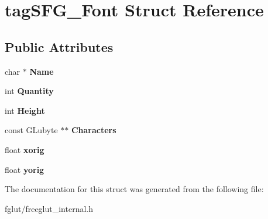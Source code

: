 \hypertarget{structtag_s_f_g___font}{}\section{tag\+S\+F\+G\+\_\+\+Font Struct Reference}
\label{structtag_s_f_g___font}
\subsection*{Public Attributes}
\begin{DoxyCompactItemize}
\item 
char $\ast$ {\bfseries Name}\hypertarget{structtag_s_f_g___font_a88a2ffc4e1720d38006875b602589cee}{}\label{structtag_s_f_g___font_a88a2ffc4e1720d38006875b602589cee}

\item 
int {\bfseries Quantity}\hypertarget{structtag_s_f_g___font_a4aa7a1492baddea769b34d0d413f2a09}{}\label{structtag_s_f_g___font_a4aa7a1492baddea769b34d0d413f2a09}

\item 
int {\bfseries Height}\hypertarget{structtag_s_f_g___font_adff4b313d038eb7e0bbad46cfa33b97e}{}\label{structtag_s_f_g___font_adff4b313d038eb7e0bbad46cfa33b97e}

\item 
const G\+Lubyte $\ast$$\ast$ {\bfseries Characters}\hypertarget{structtag_s_f_g___font_af4f579a5ff5dbd3a7b67b7375a4fbda9}{}\label{structtag_s_f_g___font_af4f579a5ff5dbd3a7b67b7375a4fbda9}

\item 
float {\bfseries xorig}\hypertarget{structtag_s_f_g___font_a71263b8516cb324c1a62e3826eff5ee4}{}\label{structtag_s_f_g___font_a71263b8516cb324c1a62e3826eff5ee4}

\item 
float {\bfseries yorig}\hypertarget{structtag_s_f_g___font_ae63c2e777542c60ab7f98fc595e4bb51}{}\label{structtag_s_f_g___font_ae63c2e777542c60ab7f98fc595e4bb51}

\end{DoxyCompactItemize}


The documentation for this struct was generated from the following file\+:\begin{DoxyCompactItemize}
\item 
fglut/freeglut\+\_\+internal.\+h\end{DoxyCompactItemize}
